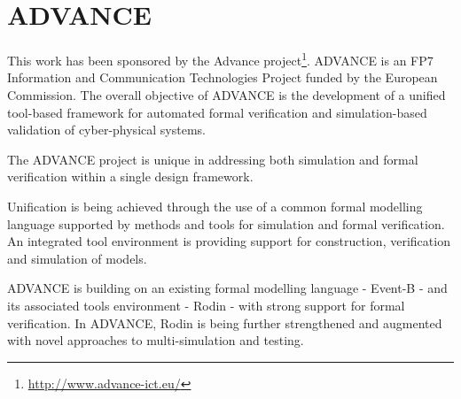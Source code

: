 \documentclass[twoside,10pt]{book}
\begin{document}
\section{ADVANCE}
\label{advance}

This work has been sponsored by the Advance project\footnote{\url{http://www.advance-ict.eu/}}.  ADVANCE is an FP7 Information and Communication Technologies Project funded by the European Commission. The overall objective of ADVANCE is the development of a unified tool-based framework for automated formal verification and simulation-based validation of cyber-physical systems.

The ADVANCE project is unique in addressing both simulation and formal verification within a single design framework.

Unification is being achieved through the use of a common formal modelling language supported by methods and tools for simulation and formal verification. An integrated tool environment is providing support for construction, verification and simulation of models.

ADVANCE is building on an existing formal modelling language - Event-B - and its associated tools environment - Rodin - with strong support for formal verification. In ADVANCE, Rodin is being further strengthened and augmented with novel approaches to multi-simulation and testing.



% 







\clearpage
{} 
\printindex
\end{document}
